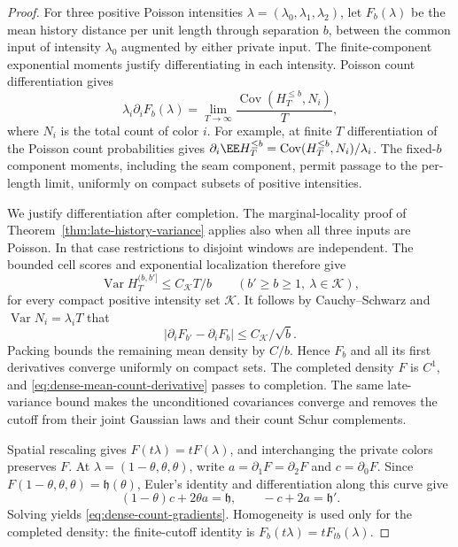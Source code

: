 \documentclass[11pt,letterpaper]{article}
\begin{document}
\begin{proof}
For three positive Poisson intensities
$\lambda=(\lambda_0,\lambda_1,\lambda_2)$, let $F_b(\lambda)$
be the mean history distance per unit length through
separation $b$, between the common input of intensity
$\lambda_0$ augmented by either private input.
The finite-component exponential moments justify
differentiating in each intensity. Poisson count
differentiation gives
\begin{equation}\label{eq:dense-mean-count-derivative}
 \lambda_i\partial_iF_b(\lambda)
   =\lim_{T\to\infty}
       \frac{\operatorname{Cov}(H_T^{\le b},N_i)}T,
\end{equation}
where $N_i$ is the total count of color $i$.
For example, at finite $T$ differentiation of the Poisson
count probabilities gives
$\partial_i\EE H_T^{\le b}
 =\operatorname{Cov}(H_T^{\le b},N_i)/\lambda_i$.
The fixed-$b$ component moments, including the seam
component, permit passage to the per-length limit,
uniformly on compact subsets of positive intensities.

We justify differentiation after completion.
The marginal-locality proof of
Theorem~\ref{thm:late-history-variance} applies also when
all three inputs are Poisson. In that case restrictions
to disjoint windows are independent. The bounded cell
scores and exponential localization therefore give
\[
 \operatorname{Var}H_T^{(b,b']}\le C_{\mathcal K}T/b
 \qquad (b'\ge b\ge1,\ \lambda\in\mathcal K),
\]
for every compact positive intensity set $\mathcal K$.
It follows by Cauchy--Schwarz and
$\operatorname{Var}N_i=\lambda_iT$ that
\[
 |\partial_iF_{b'}-\partial_iF_b|
                      \le C_{\mathcal K}/\sqrt b.
\]
Packing bounds the remaining mean density by $C/b$.
Hence $F_b$ and all its first derivatives converge uniformly
on compact sets. The completed density $F$ is $C^1$, and
\eqref{eq:dense-mean-count-derivative} passes to completion.
The same late-variance bound makes the unconditioned
covariances converge and removes the cutoff from their
joint Gaussian laws and their count Schur complements.

Spatial rescaling gives $F(t\lambda)=tF(\lambda)$, and
interchanging the private colors preserves $F$.
At $\lambda=(1-\theta,\theta,\theta)$, write
$a=\partial_1F=\partial_2F$ and $c=\partial_0F$.
Since $F(1-\theta,\theta,\theta)=\mathfrak h(\theta)$,
Euler's identity and differentiation along this curve give
\[
 (1-\theta)c+2\theta a=\mathfrak h,\qquad
 -c+2a=\mathfrak h'.
\]
Solving yields \eqref{eq:dense-count-gradients}.
Homogeneity is used only for the completed density:
the finite-cutoff identity is
$F_b(t\lambda)=tF_{tb}(\lambda)$.


\end{proof}
\end{document}
